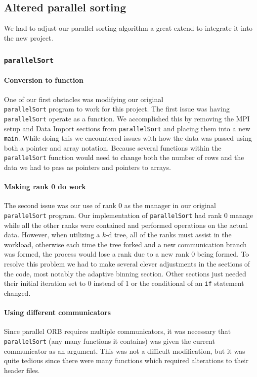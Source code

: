 \documentclass{article}
\begin{document}
\subsection{Altered parallel sorting}
We had to adjust our parallel sorting algorithm a great extend to integrate it into the new project.

\subsubsection{\texttt{parallelSort}}


\paragraph{Conversion to function}
One of our first obstacles was modifying our original \\
\texttt{parallelSort} program to work for this project. The first issue was having \texttt{parallelSort} operate as a function. We accomplished this by removing the MPI setup and Data Import sections from \texttt{parallelSort} and placing them into a new \texttt{main}. While doing this we encountered issues with how the data was passed using both a pointer and array notation. Because several functions within the \texttt{parallelSort} function would need to change both the number of rows and the data we had to pass as pointers and pointers to arrays. 


\paragraph{Making rank 0 do work}
The second issue was our use of rank 0 as the manager in our original \texttt{parallelSort} program. Our implementation of \texttt{parallelSort} had rank 0 manage while all the other ranks were contained and performed operations on the actual data. However, when utilizing a $k$-d tree, all of the ranks must assist in the workload, otherwise each time the tree forked and a new communication branch was formed, the process would lose a rank due to a new rank 0 being formed. To resolve this problem we had to make several clever adjustments in the sections of the code, most notably the adaptive binning section. Other sections just needed their initial iteration set to 0 instead of 1 or the conditional of an \texttt{if} statement changed.

\paragraph{Using different communicators}
Since parallel ORB requires multiple communicators, it was necessary that \texttt{parallelSort} (any many functions it contains) was given the current communicator as an argument. This was not a difficult modification, but it was quite tedious since there were many functions which required alterations to their header files.
\end{document}
